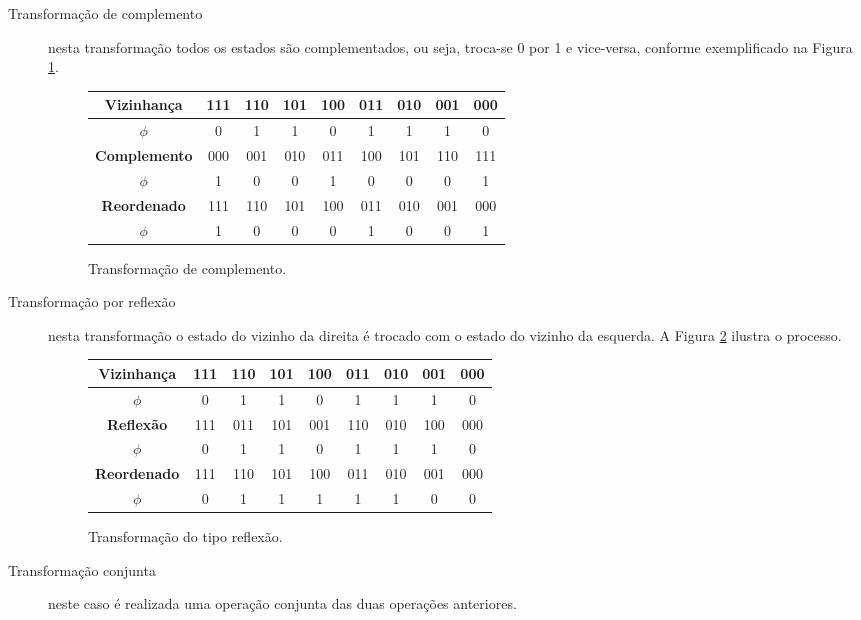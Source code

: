 \documentclass[12pt,a4paper]{article}
\begin{document}
\begin{description}

\item[Transformação de complemento] nesta transformação todos os estados são complementados,
ou seja, troca-se 0 por 1 e vice-versa, conforme exemplificado na Figura \ref{fig:complement}.

\begin{figure}[htp]
\begin{center}
\begin{tabular}{|c|c|c|c|c|c|c|c|c|}
\hline
\textbf{Vizinhança}  & 111 & 110 & 101 & 100 & 011 & 010 & 001 & 000 \\ \hline
\textbf{$\phi$}      &  0  &  1  &  1  &  0  &  1  &  1  &  1  &  0  \\ \hline
\hline
\textbf{Complemento} & 000 & 001 & 010 & 011 & 100 & 101 & 110 & 111 \\ \hline
\textbf{$\phi$}      &  1  &  0  &  0  &  1  &  0  &  0  &  0  &  1  \\ \hline
\hline
\textbf{Reordenado}  & 111 & 110 & 101 & 100 & 011 & 010 & 001 & 000 \\ \hline
\textbf{$\phi$}      &  1  &  0  &  0  &  0  &  1  &  0  &  0  &  1  \\ \hline
\end{tabular}
\caption{Transformação de complemento.}
\label{fig:complement}
\end{center}
\end{figure}

\item[Transformação por reflexão] nesta transformação o estado do vizinho da direita é
trocado com o estado do vizinho da esquerda. A Figura \ref{fig:reflex} ilustra o processo.

\begin{figure}[htp]
\begin{center}
\begin{tabular}{|c|c|c|c|c|c|c|c|c|}
\hline
\textbf{Vizinhança}  & 111 & 110 & 101 & 100 & 011 & 010 & 001 & 000 \\ \hline
\textbf{$\phi$}      &  0  &  1  &  1  &  0  &  1  &  1  &  1  &  0  \\ \hline
\hline
\textbf{Reflexão}    & 111 & 011 & 101 & 001 & 110 & 010 & 100 & 000 \\ \hline
\textbf{$\phi$}      &  0  &  1  &  1  &  0  &  1  &  1  &  1  &  0  \\ \hline
\hline
\textbf{Reordenado}  & 111 & 110 & 101 & 100 & 011 & 010 & 001 & 000 \\ \hline
\textbf{$\phi$}      &  0  &  1  &  1  &  1  &  1  &  1  &  0  &  0  \\ \hline
\end{tabular}
\caption{Transformação do tipo reflexão.}
\label{fig:reflex}
\end{center}
\end{figure}

\newpage

\item[Transformação conjunta] neste caso é realizada uma operação conjunta das duas
operações anteriores.

\end{description}
\end{document}
